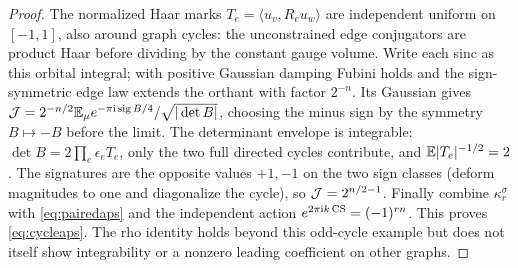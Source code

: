 \begin{proof}
The normalized Haar marks \(T_e=\langle u_v,R_eu_w\rangle\) are independent uniform on \([-1,1]\), also around graph cycles: the unconstrained edge conjugators are product Haar before dividing by the constant gauge volume. Write each sinc as this orbital integral; with positive Gaussian damping Fubini holds and the sign-symmetric edge law extends the orthant with factor \(2^{-n}\). Its Gaussian gives \({\cal J}=2^{-n/2}\mathbb E_\mu e^{-\pi\mathrm i\operatorname{sig} B/4}/\sqrt{|\det B|}\), choosing the minus sign by the symmetry \(B\mapsto-B\) before the limit. The determinant envelope is integrable: \(\det B=2\prod_e\epsilon_eT_e\), only the two full directed cycles contribute, and \(\mathbb E|T_e|^{-1/2}=2\). The signatures are the opposite values \(+1,-1\) on the two sign classes (deform magnitudes to one and diagonalize the cycle), so \({\cal J}=2^{n/2-1}\). Finally combine \(\kappa_r^\sigma\) with \eqref{eq:pairedaps} and the independent action \(e^{2\pi\mathrm i k\operatorname{CS}}=(-1)^{rn}\). This proves \eqref{eq:cycleaps}. The rho identity holds beyond this odd-cycle example but does not itself show integrability or a nonzero leading coefficient on other graphs.
\end{proof}
